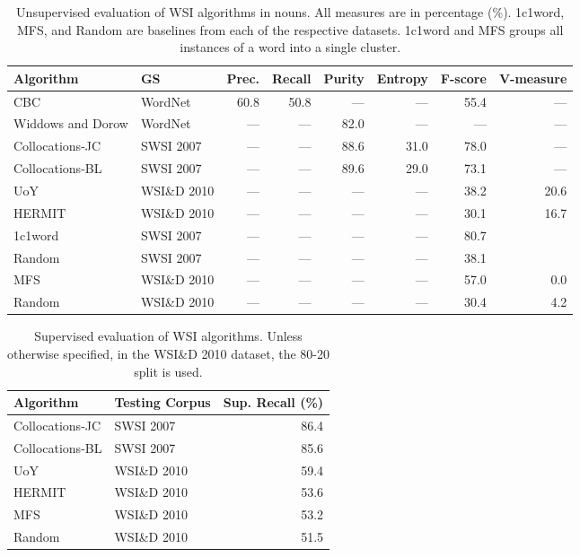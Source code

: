 \begin{table}
\caption[Unsupervised evaluation of \acl*{WSI} algorithms]
{Unsupervised evaluation of \ac{WSI} algorithms in nouns. All measures are in
percentage ($\%$). 1c1word, \ac{MFS}, and Random are baselines from each of the
respective datasets. 1c1word and \ac{MFS} groups all instances of a word into a
single cluster.}
\label{tab:uswsi}

\begin{tabu} to \textwidth { Xlrrrrrr }
\hline
\textbf{Algorithm} & \textbf{GS} & \textbf{Prec.} & \textbf{Recall} & \textbf{Purity} & \textbf{Entropy} & \textbf{F-score} & \textbf{V-measure} \\
\hline
CBC               & WordNet        & 60.8 & 50.8 & ---  & ---  & 55.4 & ---  \\
Widdows and Dorow & WordNet        & ---  & ---  & 82.0 & ---  & ---  & ---  \\
Collocations-JC   & \ac{SWSI} 2007 & ---  & ---  & 88.6 & 31.0 & 78.0 & ---  \\
Collocations-BL   & \ac{SWSI} 2007 & ---  & ---  & 89.6 & 29.0 & 73.1 & ---  \\
UoY     & WSI\&D 2010    & ---  & ---  & ---  & ---  & 38.2 & 20.6 \\
HERMIT  & WSI\&D 2010    & ---  & ---  & ---  & ---  & 30.1 & 16.7 \\
\hline
1c1word & \ac{SWSI} 2007 & ---  & ---  & ---  & ---  & 80.7 &  \\
Random  & \ac{SWSI} 2007 & ---  & ---  & ---  & ---  & 38.1 &  \\
MFS     & WSI\&D 2010    & ---  & ---  & ---  & ---  & 57.0 & 0.0  \\
Random  & WSI\&D 2010    & ---  & ---  & ---  & ---  & 30.4 & 4.2  \\
\hline
\end{tabu}
\end{table}


\begin{table}
\caption[Supervised evaluation of \acl*{WSI} algorithms]
{Supervised evaluation of \ac{WSI} algorithms. Unless otherwise specified, in
the WSI\&D 2010 dataset, the 80-20 split is used.}
\label{tab:wsi}

\begin{tabu} to \textwidth { XXr }
\hline
\textbf{Algorithm} & \textbf{Testing Corpus} & \textbf{Sup. Recall} (\%)\\
\hline
Collocations-JC           & \ac{SWSI} 2007 & 86.4 \\
Collocations-BL           & \ac{SWSI} 2007 & 85.6 \\
UoY            & WSI\&D 2010    & 59.4 \\
HERMIT           & WSI\&D 2010    & 53.6 \\
\hline
MFS           & WSI\&D 2010    & 53.2 \\
Random        & WSI\&D 2010    & 51.5 \\
\hline
\end{tabu}
\end{table}

